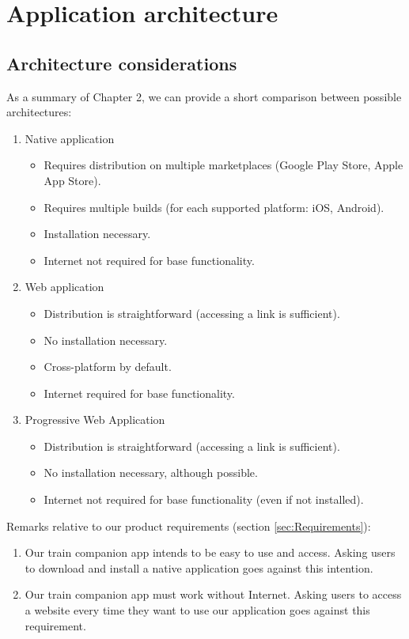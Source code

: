 \chapter{Application architecture}

\section{Architecture considerations}
As a summary of Chapter 2, we can provide a short comparison between possible architectures:

\begin{enumerate}
    \item Native application
          \begin{itemize}
              \item Requires distribution on multiple marketplaces (Google Play Store, Apple App Store).
              \item Requires multiple builds (for each supported platform: iOS, Android).
              \item Installation necessary.
              \item Internet not required for base functionality.
          \end{itemize}
    \item Web application
          \begin{itemize}
              \item Distribution is straightforward (accessing a link is sufficient).
              \item No installation necessary.
              \item Cross-platform by default.
              \item Internet required for base functionality.
          \end{itemize}
    \item Progressive Web Application
          \begin{itemize}
              \item Distribution is straightforward (accessing a link is sufficient).
              \item No installation necessary, although possible.
              \item Internet not required for base functionality (even if not installed).
          \end{itemize}
\end{enumerate}

Remarks relative to our product requirements (section \ref{sec:Requirements}):
\begin{enumerate}
    \item Our train companion app intends to be easy to use and access. Asking users to download and install a native application goes against this intention.
    \item Our train companion app must work without Internet. Asking users to access a website every time they want to use our application goes against this requirement.
\end{enumerate}


